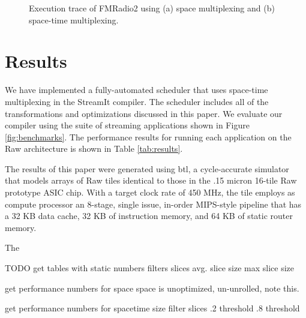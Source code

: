 \begin{figure}[t]
\centering
{}
\vspace{-6pt}
\caption{Execution trace of FMRadio2 using (a) space multiplexing and (b) space-time multiplexing.
\protect\label{fig:bloodgraph}}
\end{figure}

\section{Results}
\label{sec:results}

We have implemented a fully-automated scheduler that uses space-time
multiplexing in the StreamIt compiler.  The scheduler includes all of
the transformations and optimizations discussed in this paper.  We
evaluate our compiler using the suite of streaming applications shown
in Figure \ref{fig:benchmarks}.  The performance results for running
each application on the Raw architecture is shown in Table
\ref{tab:results}.

The results of this paper were generated using btl, a cycle-accurate
simulator that models arrays of Raw tiles identical to those in the
.15 micron 16-tile Raw prototype ASIC chip.  With a target clock rate
of 450 MHz, the tile employs as compute processor an 8-stage, single
issue, in-order MIPS-style pipeline that has a 32 KB data cache, 32 KB
of instruction memory, and 64 KB of static router memory.



The 

TODO
get tables with static numbers
	filters
	slices
	avg. slice size
	max slice size

get performance numbers for space
	space is unoptimized, un-unrolled, note this.

get performance numbers for spacetime 
	size filter slices
	.2 threshold
	.8 threshold
